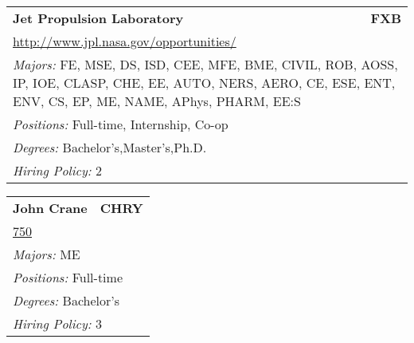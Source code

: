 \documentclass[twoside]{article}
\begin{document}
\begin{center}
\begin{multicols}{3}
\begin{FlushLeft}
\begin{minipage}{.9\columnwidth}\begin{tabularx}{.95\columnwidth}{Xr}
                 {\Large\bf Jet Propulsion Laboratory} & {\Large\bf FXB}\\
    \multicolumn{2}{p{.95\columnwidth}}{\url{http://www.jpl.nasa.gov/opportunities/}}\\
    \multicolumn{2}{p{.95\columnwidth}}{\emph{Majors:} FE, MSE, DS, ISD, CEE, MFE, BME, CIVIL, ROB, AOSS, IP, IOE, CLASP, CHE, EE, AUTO, NERS, AERO, CE, ESE, ENT, ENV, CS, EP, ME, NAME, APhys, PHARM, EE:S}\\
    \multicolumn{2}{p{.95\columnwidth}}{\emph{Positions:} Full-time, Internship, Co-op}\\
    \multicolumn{2}{p{.95\columnwidth}}{\emph{Degrees:} Bachelor's,Master's,Ph.D.}\\
    \multicolumn{2}{p{.95\columnwidth}}{\emph{Hiring Policy:} 2}\\
    \end{tabularx}
    
\end{minipage}
 
\begin{minipage}{.9\columnwidth}\begin{tabularx}{.95\columnwidth}{Xr}
                 {\Large\bf John Crane} & {\Large\bf CHRY}\\
    \multicolumn{2}{p{.95\columnwidth}}{\url{750}}\\
    \multicolumn{2}{p{.95\columnwidth}}{\emph{Majors:} ME}\\
    \multicolumn{2}{p{.95\columnwidth}}{\emph{Positions:} Full-time}\\
    \multicolumn{2}{p{.95\columnwidth}}{\emph{Degrees:} Bachelor's}\\
    \multicolumn{2}{p{.95\columnwidth}}{\emph{Hiring Policy:} 3}\\
    \end{tabularx}
    
\end{minipage}
 

\end{FlushLeft}
\end{multicols}
\end{center}
\end{document}
